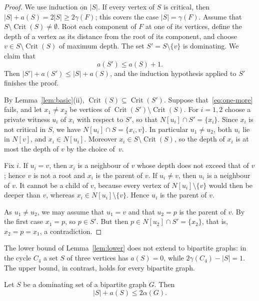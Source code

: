 \documentclass[smallextended,envcountsect,envcountsame]{svjour3}
\newcommand{\Crit}{\operatorname{Crit}}
\begin{document}
\begin{proof}
We use induction on $|S|$. If every vertex of $S$ is critical, then
$|S|+a(S)=2|S|\ge2\gamma(F)$; this covers the case $|S|=\gamma(F)$. Assume
that $S\setminus\Crit(S)\ne\emptyset$. Root each component of $F$ at one of
its vertices, define the depth of a vertex as its distance from the root of
its component, and choose $v\in S\setminus\Crit(S)$ of maximum depth. The
set $S'=S\setminus\{v\}$ is dominating. We claim that
\begingroup\small\begin{equation}\label{eq:one-more}
  a(S')\le a(S)+1 .
\end{equation}\endgroup
Then $|S'|+a(S')\le|S|+a(S)$, and the induction hypothesis applied to $S'$
finishes the proof.

By Lemma~\ref{lem:basic}(ii), $\Crit(S)\subseteq\Crit(S')$. Suppose
that~\eqref{eq:one-more} fails, and let $x_1\ne x_2$ be vertices of
$\Crit(S')\setminus\Crit(S)$. For $i=1,2$ choose a private witness $u_i$ of
$x_i$ with respect to $S'$, so that $N[u_i]\cap S'=\{x_i\}$. Since $x_i$ is
not critical in $S$, we have $N[u_i]\cap S=\{x_i,v\}$. In particular
$u_1\ne u_2$, both $u_i$ lie in $N[v]$, and $x_i\in N[u_i]$. Moreover
$x_i\in S\setminus\Crit(S)$, so the depth of $x_i$ is at most the depth of
$v$ by the choice of~$v$.

Fix $i$. If $u_i=v$, then $x_i$ is a neighbour of $v$ whose depth does not
exceed that of $v$; hence $v$ is not a root and $x_i$ is the parent of $v$.
If $u_i\ne v$, then $u_i$ is a neighbour of $v$. It cannot be a child of
$v$, because every vertex of $N[u_i]\setminus\{v\}$ would then be deeper than
$v$, whereas $x_i\in N[u_i]\setminus\{v\}$. Hence $u_i$ is the parent of $v$.

As $u_1\ne u_2$, we may assume that $u_1=v$ and that $u_2=p$ is the parent of
$v$. By the first case $x_1=p$, so $p\in S'$. But then
$p\in N[u_2]\cap S'=\{x_2\}$, that is, $x_2=p=x_1$, a contradiction.
\end{proof}

The lower bound of Lemma~\ref{lem:lower} does not extend to bipartite
graphs: in the cycle $C_4$ a set $S$ of three vertices has $a(S)=0$, while
$2\gamma(C_4)-|S|=1$. The upper bound, in contrast, holds for every bipartite
graph.

\begin{lemma}\label{lem:upper}
Let $S$ be a dominating set of a bipartite graph $G$. Then
\begingroup\small\[
  |S|+a(S)\le 2\alpha(G).
\]\endgroup
\end{lemma}
\end{document}
